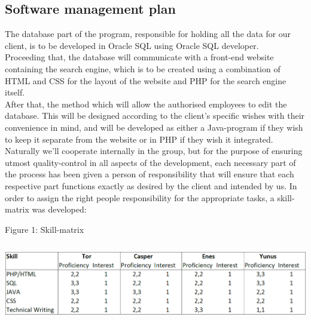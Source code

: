 \documentclass[12pt,a4paper]{article}
\begin{document}
\subsection{Software management plan}
The database part of the program, responsible for holding all the data for our client, is to be developed in Oracle SQL using Oracle SQL developer.\\
Proceeding that, the database will communicate with a front-end website containing the search engine, which is to be created using a combination of HTML and CSS for the layout of the website and PHP for the search engine itself.\\
After that, the method which will allow the authorised employees to edit the database. This will be designed according to the client’s specific wishes with their convenience in mind, and will be developed as either a Java-program if they wish to keep it separate from the website or in PHP if they wish it integrated.\\
Naturally we’ll cooperate internally in the group, but for the purpose of ensuring utmost quality-control in all aspects of the development, each necessary part of the process has been given a person of responsibility that will ensure that each respective part functions exactly as desired by the client and intended by us.
In order to assign the right people responsibility for the appropriate tasks, a skill-matrix was developed:\\

\begin{center}
Figure 1: Skill-matrix
\end{center}

\includegraphics[height=35mm]{Skillmatrix.png}\\
\end{document}
